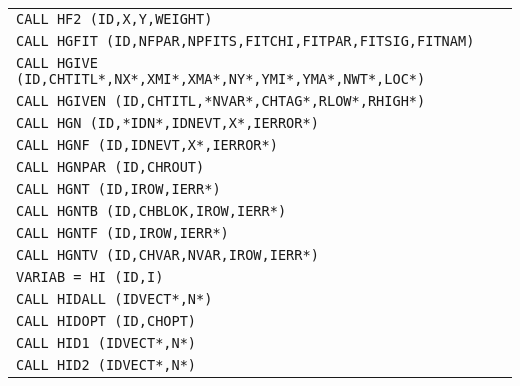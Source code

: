 \begin{longtable}{|>{\tt}p{.9\linewidth}r|}
CALL     HF2    (ID,X,Y,WEIGHT)              
&                                                       \pageref{HF2}    \\
CALL     HGFIT  (ID,NFPAR,NPFITS,FITCHI,FITPAR,FITSIG,FITNAM)
&                                                       \pageref{HGFIT}  \\
CALL     HGIVE  (ID,CHTITL*,NX*,XMI*,XMA*,NY*,YMI*,YMA*,NWT*,LOC*)
&                                                       \pageref{HGIVE}  \\
CALL     HGIVEN (ID,CHTITL,*NVAR*,CHTAG*,RLOW*,RHIGH*)
&                                                       \pageref{HGIVEN} \\
CALL     HGN    (ID,*IDN*,IDNEVT,X*,IERROR*)
&                                                       \pageref{HGN}    \\
CALL     HGNF   (ID,IDNEVT,X*,IERROR*)         
&                                                       \pageref{HGIVEN} \\
CALL     HGNPAR (ID,CHROUT)
&                                                       \pageref{HGNPAR} \\
CALL     HGNT   (ID,IROW,IERR*)            
&                                                       \pageref{HGNT}   \\
CALL     HGNTB  (ID,CHBLOK,IROW,IERR*)            
&                                                       \pageref{HGNTB}  \\
CALL     HGNTF  (ID,IROW,IERR*)            
&                                                       \pageref{HGNTF}  \\
CALL     HGNTV  (ID,CHVAR,NVAR,IROW,IERR*)            
&                                                       \pageref{HGNTV}  \\
VARIAB = HI    (ID,I)                        
&                                                       \pageref{HI}     \\
CALL     HIDALL  (IDVECT*,N*)                 
&                                                       \pageref{HIDALL} \\
CALL     HIDOPT (ID,CHOPT)                   
&                                                       \pageref{HIDOPT} \\
CALL     HID1   (IDVECT*,N*)                 
&                                                       \pageref{HID1}   \\
CALL     HID2   (IDVECT*,N*)                 
&                                                       \pageref{HID2}   \\

\end{longtable}
